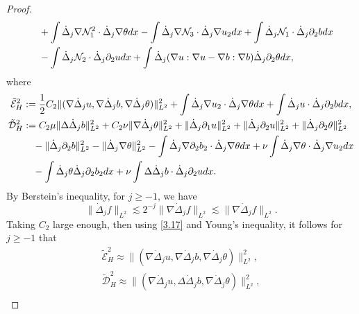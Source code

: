 \documentclass[10pt,a4paper]{amsart}
\numberwithin{equation}{section}
\begin{document}
\begin{proof}
\begin{equation}
\begin{aligned}
&\quad +\int\dot{\Delta}_j\nabla \mathcal{N}_1^2\cdot\dot{\Delta}_j\nabla\theta{\rm d}x
 -\int\dot{\Delta}_j\nabla\mathcal{N}_3\cdot\dot{\Delta}_j\nabla u_2{\rm d}x
 +\int\dot{\Delta}_j \mathcal{N}_1\cdot\dot{\Delta}_j\partial_2b{\rm d}x \\
&\quad -\int\dot{\Delta}_j\mathcal{N}_2\cdot\dot{\Delta}_j\partial_2 u{\rm d}x
 +\int\dot{\Delta}_j(\nabla u:\nabla u-\nabla b:\nabla b)
 \dot{\Delta}_j\partial_2\theta{\rm d}x,
\end{aligned}
\end{equation}
where
\begin{gather*}
 \tilde{\mathcal{E}}_H^2
:=\frac{1}{2}C_2\|(\nabla\dot{\Delta}_ju,\nabla\dot{\Delta}_jb,
 \nabla\dot{\Delta}_j\theta)\|_{L^2}^2+\int\dot{\Delta}_j\nabla u_2\cdot
 \dot{\Delta}_j\nabla\theta{\rm d}x+\int\dot{\Delta}_j u\cdot\dot{\Delta}_j
 \partial_2b{\rm d}x,\\
\begin{aligned}
 \tilde{\mathcal{D}}_H^2
&:= C_2\mu\|\Delta\dot{\Delta}_jb\|_{L^2}^2+C_2\nu\|\nabla\dot{\Delta}_j\theta\|_{L^2}^2
 +\|\dot{\Delta}_j\partial_1 u\|_{L^2}^2+\|\dot{\Delta}_j\partial_2 u\|_{L^2}^2
 +\|\dot{\Delta}_j\partial_2\theta\|_{L^2}^2 \\
&\quad -\|\dot{\Delta}_j\partial_2b\|_{L^2}^2
 -\|\dot{\Delta}_j\nabla \theta\|_{L^2}^2
 -\int\dot{\Delta}_j\nabla\partial_2b_2\cdot\dot{\Delta}_j\nabla\theta{\rm d}x
 +\nu\int\dot{\Delta}_j\nabla\theta\cdot\dot{\Delta}_j\nabla u_2{\rm d}x \\
 &\quad -\int\dot{\Delta}_j\theta\dot{\Delta}_j\partial_2b_2{\rm d}x
  +\nu\int\Delta\dot{\Delta}_jb\cdot\dot{\Delta}_j\partial_2 u{\rm d}x.
 \end{aligned}
\end{gather*}
By Berstein's inequality, for $j\geqslant -1$, we have
\begin{equation}\label{3.17}
 \|\dot{\Delta}_jf\|_{L^2}\lesssim2^{-j}\|\nabla\dot{\Delta}_jf\|_{L^2}\lesssim\|\nabla\dot{\Delta}_jf\|_{L^2}.
\end{equation}
Taking $C_2$ large enough, then using \eqref{3.17} and Young's inequality,
it follows for $j\geqslant -1$ that
\begin{equation}\label{3.18}
\begin{gathered}
 \tilde{\mathcal{E}}_H^2\approx\|(\nabla\dot{\Delta}_ju,\nabla\dot{\Delta}_jb,\nabla\dot{\Delta}_j\theta)\|_{L^2}^2, \\
 \tilde{\mathcal{D}}_H^2\approx\|(\nabla\dot{\Delta}_ju,\Delta\dot{\Delta}_jb,\nabla\dot{\Delta}_j\theta)\|_{L^2}^2, \\

\end{gathered}
\end{equation}
\end{proof}
\end{document}
